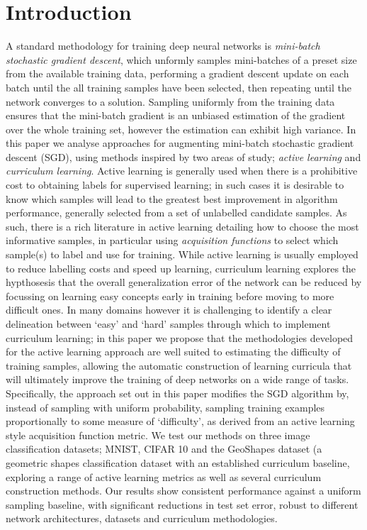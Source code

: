 \chapter{Introduction}

A standard methodology for training deep neural networks is \textit{mini-batch stochastic gradient descent}, which unformly samples mini-batches of a preset size from the available training data, performing a gradient descent update on each batch until the all training samples have been selected, then repeating until the network converges to a solution. Sampling uniformly from the training data ensures that the mini-batch gradient is an unbiased estimation of the gradient over the whole training set, however the estimation can exhibit high variance. In this paper we analyse approaches for augmenting mini-batch stochastic gradient descent (SGD), using methods inspired by two areas of study; \textit{active learning} and \textit{curriculum learning}. Active learning is generally used when there is a prohibitive cost to obtaining labels for supervised learning; in such cases it is desirable to know which samples will lead to the greatest best improvement in algorithm performance, generally selected from a set of unlabelled candidate samples. As such, there is a rich literature in active learning detailing how to choose the most informative samples, in particular using \textit{acquisition functions} to select which sample(s) to label and use for training. While active learning is usually employed to reduce labelling costs and speed up learning, curriculum learning explores the hypthosesis that the overall generalization error of the network can be reduced by focussing on learning easy concepts early in training before moving to more difficult ones. In many domains however it is challenging to identify a clear delineation between `easy' and `hard' samples through which to implement curriculum learning; in this paper we propose that the methodologies developed for the active learning approach are well suited to estimating the difficulty of training samples, allowing the automatic construction of learning curricula that will ultimately improve the training of deep networks on a wide range of tasks. Specifically, the approach set out in this paper modifies the SGD algorithm by, instead of sampling with uniform probability, sampling training examples proportionally to some measure of `difficulty', as derived from an active learning style acquisition function metric. We test our methods on three image classification datasets; MNIST, CIFAR 10 and the GeoShapes dataset (a geometric shapes classification dataset with an established curriculum baseline, exploring a range of active learning metrics as well as several curriculum construction methods. Our results show consistent performance against a uniform sampling baseline, with significant reductions in test set error, robust to different network architectures, datasets and curriculum methodologies. 


